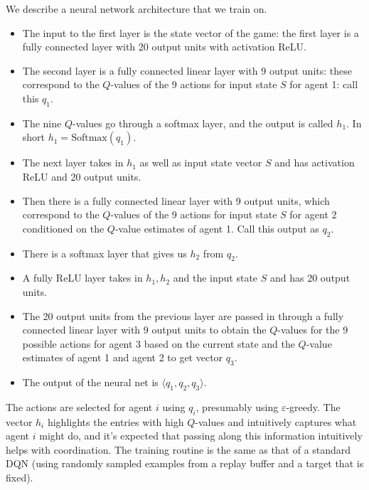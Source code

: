 \documentclass{article}
\begin{document}
We describe a neural network architecture that we train
on.
\begin{itemize}

\item The input to the first layer is the state vector of
the game: the first layer is a fully connected layer
with 20 output units with activation ReLU.

\item The second layer is a fully connected linear layer
with 9 output units: these correspond to the $Q$-values
of the 9 actions for input state $S$ for agent 1: call
this $q_1$.

\item The nine $Q$-values go through a softmax layer, and the
output is called $h_1$. In short $h_1=\mathrm{Softmax}(q_1)$.

\item The next layer takes in $h_1$ as well as input
state vector $S$ and has activation ReLU and 20 output
units.

\item Then there is a fully connected linear layer with
9 output units, which correspond to the $Q$-values
of the 9 actions for input state $S$ for agent 2
conditioned on the $Q$-value estimates of
agent 1. Call this output as $q_2$.

\item There is a softmax layer that gives us $h_2$ from
$q_2$.

\item A fully ReLU layer takes in $h_1, h_2$ and the input
state $S$ and has 20 output units. 

\item The 20 output units from the previous layer are
passed in through a fully connected linear layer with
9 output units to obtain the $Q$-values for the 9
possible actions for agent 3 based on the current state
and the $Q$-value estimates of agent 1 and agent 2
to get vector $q_3$.

\item The output of the neural net is $\langle q_1,q_2,q_3
\rangle$.

\end{itemize}

The actions are selected for agent $i$ using $q_i$,
presumably using $\varepsilon$-greedy.
The vector $h_i$ highlights the entries with
high $Q$-values and intuitively captures
what agent $i$ might do, and it's expected that
passing along this information intuitively helps
with coordination. The training routine is the same as that
of a standard DQN (using randomly sampled examples from
a replay buffer and a target that is fixed).
\end{document}
